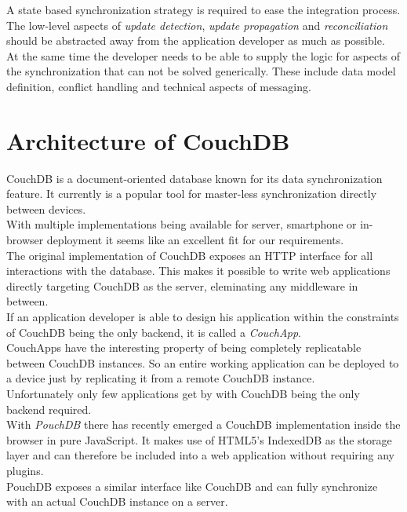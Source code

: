 A state based synchronization strategy is required to ease the integration process. The low-level aspects of \emph{update detection}, \emph{update propagation} and \emph{reconciliation} should be abstracted away from the application developer as much as possible.\\
At the same time the developer needs to be able to supply the logic for aspects of the synchronization that can not be solved generically. These include data model definition, conflict handling and technical aspects of messaging.

\section{Architecture of CouchDB}
CouchDB is a document-oriented database known for its data synchronization feature.
It currently is a popular tool for master-less synchronization directly between devices.\\
With multiple implementations being available for server, smartphone or in-browser deployment it seems like an excellent fit for our requirements.\\

The original implementation of CouchDB exposes an HTTP interface for all interactions with the database.
This makes it possible to write web applications directly targeting CouchDB as the server, eleminating any middleware in between.\\
If an application developer is able to design his application within the constraints of CouchDB being the only backend, it is called a \emph{CouchApp}.\\
CouchApps have the interesting property of being completely replicatable between CouchDB instances.
So an entire working application can be deployed to a device just by replicating it from a remote CouchDB instance.\\
Unfortunately only few applications get by with CouchDB being the only backend required.\\

With \emph{PouchDB} there has recently emerged a CouchDB implementation inside the browser in pure JavaScript.
It makes use of HTML5's IndexedDB as the storage layer and can therefore be included into a web application without requiring any plugins.\\
PouchDB exposes a similar interface like CouchDB and can fully synchronize with an actual CouchDB instance on a server.\\

